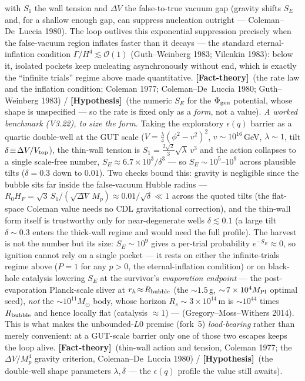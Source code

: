 \documentclass[11pt]{article}
\newcommand{\factth}{\textcolor{green!40!black}{\textbf{[Fact-theory]}}}
\newcommand{\hyp}{\textcolor{orange!80!black}{\textbf{[Hypothesis]}}}
\begin{document}
with $S_1$ the wall tension and $\Delta V$ the false-to-true vacuum gap (gravity shifts $S_E$ and, for a shallow enough gap, can suppress nucleation outright --- Coleman--De~Luccia 1980). The loop outlives this exponential suppression precisely when the false-vacuum region inflates faster than it decays --- the standard eternal-inflation condition $\Gamma/H^{4}\lesssim\mathcal{O}(1)$ (Guth--Weinberg 1983; Vilenkin 1983): below it, isolated pockets keep nucleating asynchronously without end, which is exactly the ``infinite trials'' regime above made quantitative. \factth\ (the rate law and the inflation condition; Coleman 1977; Coleman--De~Luccia 1980; Guth--Weinberg 1983) / \hyp\ (the numeric $S_E$ for the $\Phi_{\rm gen}$ potential, whose shape is unspecified --- so the rate is fixed only as a \emph{form}, not a value). \emph{A worked benchmark (V3.22), to size the form.} Taking the exploratory $\epsilon(q)$ barrier as a quartic double-well at the GUT scale ($V=\tfrac{\lambda}{4}(\phi^2-v^2)^2$, $v\!\sim\!10^{16}$\,GeV, $\lambda\!\sim\!1$, tilt $\delta\!\equiv\!\Delta V/V_{\rm top}$), the thin-wall tension is $S_1=\tfrac{2\sqrt2}{3}\sqrt{\lambda}\,v^3$ and the action collapses to a single scale-free number, $S_E\!\approx\!6.7\times10^{3}/\delta^{3}$ --- so $S_E\!\sim\!10^{5}$--$10^{9}$ across plausible tilts ($\delta\!=\!0.3$ down to $0.01$). Two checks bound this: gravity is negligible since the bubble sits far inside the false-vacuum Hubble radius --- $R_0H_F=\sqrt3\,S_1/(\sqrt{\Delta V}\,M_p)\approx0.01/\sqrt{\delta}\ll1$ across the quoted tilts (the flat-space Coleman value needs no CDL gravitational correction), and the thin-wall form itself is trustworthy only for near-degenerate wells $\delta\!\lesssim\!0.1$ (a large tilt $\delta\!\sim\!0.3$ enters the thick-wall regime and would need the full profile). The harvest is not the number but its size: $S_E\!\sim\!10^{9}$ gives a per-trial probability $e^{-S_E}\!\approx\!0$, so ignition cannot rely on a single pocket --- it rests on either the infinite-trials regime above ($P\!=\!1$ for any $p>0$, the eternal-inflation condition) or on black-hole catalysis lowering $S_E$ at the survivor's \emph{evaporation endpoint} --- the post-evaporation Planck-scale sliver at $r_h\!\approx\!R_{\rm bubble}$ (the $\sim\!1.5$\,g, $\sim\!7\times10^{4}M_{\rm Pl}$ optimal seed), \emph{not} the $\sim\!10^{11}M_\odot$ body, whose horizon $R_s\!\sim\!3\times10^{14}$\,m is $\sim\!10^{44}$ times $R_{\rm bubble}$ and hence locally flat (catalysis $\approx1$) --- (Gregory--Moss--Withers 2014). This is what makes the unbounded-$L0$ premise (fork~5) \emph{load-bearing} rather than merely convenient: at a GUT-scale barrier only one of those two escapes keeps the loop alive. \factth\ (thin-wall action and tension, Coleman 1977; the $\Delta V/M_p^4$ gravity criterion, Coleman--De~Luccia 1980) / \hyp\ (the double-well shape parameters $\lambda,\delta$ --- the $\epsilon(q)$ profile the value still awaits).
\end{document}
